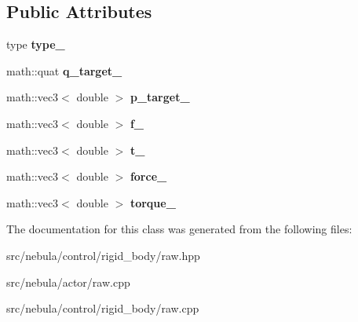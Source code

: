 \subsection*{\-Public \-Attributes}
\begin{DoxyCompactItemize}
\item 
\hypertarget{classneb_1_1control_1_1rigid__body_1_1raw_a8f5fb347a6c58f62b223c48a1813e2e4}{type {\bfseries type\-\_\-}}\label{classneb_1_1control_1_1rigid__body_1_1raw_a8f5fb347a6c58f62b223c48a1813e2e4}

\item 
\hypertarget{classneb_1_1control_1_1rigid__body_1_1raw_a472812f3800fc91527720e7922aa11f7}{math\-::quat {\bfseries q\-\_\-target\-\_\-}}\label{classneb_1_1control_1_1rigid__body_1_1raw_a472812f3800fc91527720e7922aa11f7}

\item 
\hypertarget{classneb_1_1control_1_1rigid__body_1_1raw_a65f9cf9ce195cef108adfdfca2f94478}{math\-::vec3$<$ double $>$ {\bfseries p\-\_\-target\-\_\-}}\label{classneb_1_1control_1_1rigid__body_1_1raw_a65f9cf9ce195cef108adfdfca2f94478}

\item 
\hypertarget{classneb_1_1control_1_1rigid__body_1_1raw_a1af8a9c496392f96a542964536a41f1f}{math\-::vec3$<$ double $>$ {\bfseries f\-\_\-}}\label{classneb_1_1control_1_1rigid__body_1_1raw_a1af8a9c496392f96a542964536a41f1f}

\item 
\hypertarget{classneb_1_1control_1_1rigid__body_1_1raw_a5a5814c383407852a180a03451aab534}{math\-::vec3$<$ double $>$ {\bfseries t\-\_\-}}\label{classneb_1_1control_1_1rigid__body_1_1raw_a5a5814c383407852a180a03451aab534}

\item 
\hypertarget{classneb_1_1control_1_1rigid__body_1_1raw_aa4ce0e8f719757e560c259b015f35200}{math\-::vec3$<$ double $>$ {\bfseries force\-\_\-}}\label{classneb_1_1control_1_1rigid__body_1_1raw_aa4ce0e8f719757e560c259b015f35200}

\item 
\hypertarget{classneb_1_1control_1_1rigid__body_1_1raw_aff9ff856531641609a94713bda40fef9}{math\-::vec3$<$ double $>$ {\bfseries torque\-\_\-}}\label{classneb_1_1control_1_1rigid__body_1_1raw_aff9ff856531641609a94713bda40fef9}

\end{DoxyCompactItemize}


\-The documentation for this class was generated from the following files\-:\begin{DoxyCompactItemize}
\item 
src/nebula/control/rigid\-\_\-body/raw.\-hpp\item 
src/nebula/actor/raw.\-cpp\item 
src/nebula/control/rigid\-\_\-body/raw.\-cpp\end{DoxyCompactItemize}

